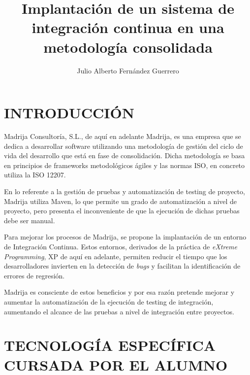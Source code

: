 \documentclass{pre-tfg}
\title{Implantación de un sistema de integración continua en una metodología consolidada}
\author{Julio Alberto Fernández Guerrero}
\begin{document}
\maketitle

\renewcommand{\thepage}{\roman{page}}
\tableofcontents

\newpage 

\renewcommand{\thepage}{\arabic{page}}
\setcounter{page}{1}


\section{INTRODUCCIÓN}

Madrija Consultoría, S.L., de aquí en adelante Madrija, es una empresa que se dedica a desarrollar software utilizando una metodología de gestión del ciclo de vida del desarrollo que está en fase de consolidación. Dicha metodología se basa en principios de frameworks metodológicos ágiles y las normas ISO, en concreto utiliza la ISO 12207\cite{ISO_12207}.

En lo referente a la gestión de pruebas y automatización de testing de proyecto, Madrija utiliza Maven\cite{Maven}, lo que permite un grado de automatización a nivel de proyecto, pero presenta el inconveniente de que la ejecución de dichas pruebas debe ser manual.

Para mejorar los procesos de Madrija, se propone la implantación de un  entorno de Integración Continua\cite{IC}. Estos entornos, derivados de la práctica de \textit{eXtreme Programming}\cite{XP}, XP de aquí en adelante, permiten reducir el tiempo que los desarrolladores invierten en la detección de \textit{bugs} y facilitan la identificación de errores de regresión.

Madrija es consciente de estos beneficios y por esa razón pretende mejorar y aumentar la automatización de la ejecución de testing de integración, aumentando el alcance de las pruebas a nivel de integración entre proyectos.

\section{TECNOLOGÍA ESPECÍFICA CURSADA POR EL ALUMNO}
\end{document}
